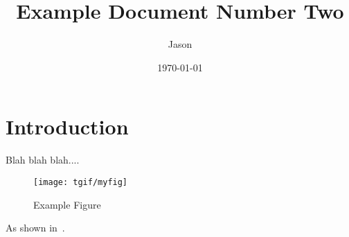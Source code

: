\documentclass[11pt]{article}
\title{Example Document Number Two}
\author{Jason}
\date{\today}
\begin{document}
\maketitle
\section{Introduction}
Blah blah blah....

\begin{figure}[ht]
\centering
\texttt{[image: tgif/myfig]}
\caption{Example Figure}
\label{fig:myfig}
\end{figure}

As shown in~\cite{en300.175-2v1.4.2}.


\end{document}
